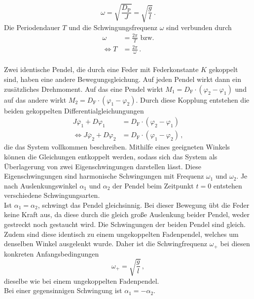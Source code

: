 \begin{equation*}
 \omega = \sqrt{\frac{D_{\text{P}}}{J}} = \sqrt{\frac{g}{l}}\, .
\end{equation*}
Die Periodendauer $T$ und die Schwingungsfrequenz $\omega$ sind verbunden durch 
\begin{align}
    \omega &= \frac{2 \pi}{T} \,\,\text{bzw.} \label{eqn:VerbindungOmegaT}\\
    \Leftrightarrow T &= \frac{2 \pi}{\omega} \label{eqn:VerbindungTOmega}\, .
\end{align}
\\
Zwei identische Pendel, die durch eine Feder mit Federkonstante $K$ gekoppelt sind, haben eine andere Bewegungsgleichung. 
Auf jeden Pendel wirkt dann ein zusätzliches Drehmoment. Auf das eine Pendel wirkt $M_1 = D_{\text{F}} \cdot (\varphi_2 - \varphi_1)$ 
und auf das andere wirkt $M_2 = D_{\text{F}} \cdot (\varphi_1 - \varphi_2)$. 
Durch diese Kopplung entstehen die beiden gekoppelten Differentialgleichungungen
\begin{align*}
J \ddot{\varphi_1} + D \varphi_1 &= D_{\text{F}} \cdot \left( \varphi_{2} - \varphi_{1} \right) \\
\Leftrightarrow J \ddot{\varphi_2} + D \varphi_2 &= D_{\text{F}} \cdot \left( \varphi_{1} - \varphi_{2} \right) \, ,
\end{align*}
die das System vollkommen beschreiben.
Mithilfe eines geeigneten Winkels können die Gleichungen entkoppelt werden, sodass sich das System als Überlagerung von zwei Eigenschwingungen darstellen lässt. 
Diese Eigenschwingungen sind harmonische Schwingungen mit Frequenz $\omega_{1}$ und $\omega_{2}$. 
Je nach Auslenkungswinkel $\alpha_1$ und $\alpha_2$ der Pendel beim Zeitpunkt $t = 0$ entstehen verschiedene Schwingungsarten. 
\\
Ist $\alpha_1 = \alpha_2$, schwingt das Pendel gleichsinnig. Bei dieser Bewegung übt die Feder keine Kraft aus, da diese durch die gleich große Auslenkung beider
Pendel, weder gestreckt noch gestaucht wird. Die Schwingungen der beiden Pendel sind gleich. Zudem sind diese identisch zu einem ungekoppelten Fadenpendel, welches um 
denselben Winkel ausgelenkt wurde. Daher ist die Schwingfrequenz $\omega_+$ bei diesen konkreten Anfangsbedingungen 
\begin{equation}
    \omega_+ = \sqrt{\frac{g}{l}}\, ,
    \label{eqn:OmegaGleichsinnig}
\end{equation}
dieselbe wie bei einem ungekoppelten Fadenpendel. \\
Bei einer gegensinnigen Schwingung ist $\alpha_1 = - \alpha_2$. 
